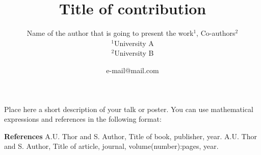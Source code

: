 \documentclass[a4paper]{article}
\title{Title of contribution}
\author{Name of the author that is going to present the work$^{1}$, Co-authors$^{2}$  \\
        \small $^{1}$University A \\
        \small $^{2}$University B \\
}
\date{e-mail@mail.com} %
\begin{document}
\maketitle

Place here a short description of your talk or poster. You can use mathematical expressions and references in the following format:

{\bf References}
\newline
[1] A.U. Thor and S. Author, Title of book, publisher, year. 
\newline
[2] A.U. Thor and S. Author, Title of article, journal, volume(number):pages, year.
\end{document}
